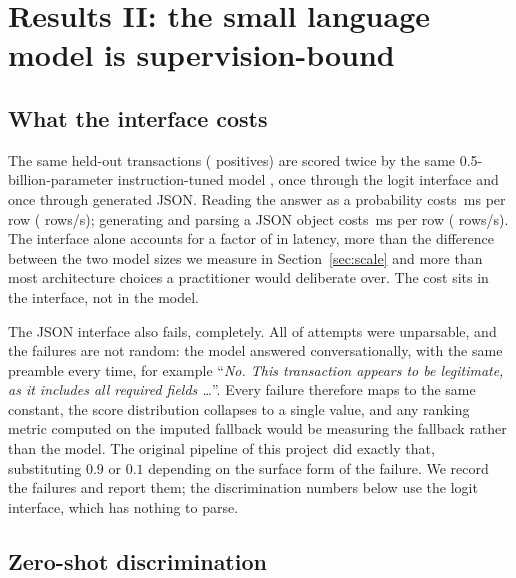 \section{Results II: the small language model is supervision-bound}\label{sec:lang}

\subsection{What the interface costs}

The same \LlmRows{} held-out transactions (\LlmPositives{} positives) are scored
twice by the same \num{0.5}-billion-parameter instruction-tuned model
\cite{qwen2024report}, once through the logit interface and once through generated
JSON. Reading the answer as a probability costs \LlmMsRow\,ms per row
(\LlmRowsPerS{} rows/s); generating and parsing a JSON object costs
\JsonMsRow\,ms per row (\JsonRowsPerS{} rows/s). The interface alone accounts for
a factor of \InterfaceRatio{} in latency, more than the difference between the two
model sizes we measure in Section~\ref{sec:scale} and more than most architecture
choices a practitioner would deliberate over. The cost sits in the interface, not
in the model.

The JSON interface also fails, completely. All \ParseFailRows{} of
\ParseFailDenom{} attempts were unparsable, and the failures are not random: the
model answered conversationally, with the same preamble every time, for example
``\emph{No. This transaction appears to be legitimate, as it includes all required
fields \dots}''. Every failure therefore maps to the same constant, the score
distribution collapses to a single value, and any ranking metric computed on the
imputed fallback would be measuring the fallback rather than the model. The
original pipeline of this project did exactly that, substituting $0.9$ or $0.1$
depending on the surface form of the failure. We record the failures and report
them; the discrimination numbers below use the logit interface, which has nothing
to parse.

\subsection{Zero-shot discrimination}

\begin{table}[t]
\centering
\resizebox{\textwidth}{!}{}
\caption{Language model against gradient-boosted trees on identical held-out rows.
The logit interface reads $P(\texttt{Yes})$ at the answer position; the JSON
interface generates and parses an object. Parse failures are counted, never
imputed. Latency is per row in the same run. Data:
\texttt{s8\_llm/zero\_shot\_0\_5b.json},
\texttt{s8\_llm/lora\_sft\_0\_5b.json}.}
\label{tab:llm}
\end{table}

